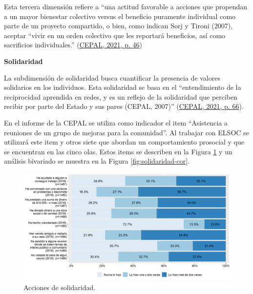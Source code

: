 \documentclass[
  12pt,
]{book}
\begin{document}
Esta tercera dimensión refiere a ``una actitud favorable a acciones que propendan a un mayor bienestar colectivo versus el beneficio puramente individual como parte de un proyecto compartido, o bien, como indican Sorj y Tironi (2007), aceptar ``vivir en un orden colectivo que les reportará beneficios, así como sacrificios individuales.'' (\protect\hyperlink{ref-cepal_cohesion_2021}{CEPAL, 2021, p. 46})

\textbf{Solidaridad}

La subdimensión de solidaridad busca cuantificar la presencia de valores solidarios en los individuos. Esta solidaridad se basa en el ``entendimiento de la reciprocidad aprendida en redes, y es un reflejo de la solidaridad que perciben recibir por parte del Estado y sus pares (CEPAL, 2007)'' (\protect\hyperlink{ref-cepal_cohesion_2021}{CEPAL, 2021, p. 66}).

En el informe de la CEPAL se utiliza como indicador el item ``Asistencia a reuniones de un grupo de mejoras para la comunidad''. Al trabajar con ELSOC se utilizará este item y otros siete que abordan un comportamiento prosocial y que se encuentran en las cinco olas. Estos items se describen en la Figura \ref{fig:solidaridad} y un análisis bivariado se muestra en la Figura \ref{fig:solidaridad-cor}.

\begin{figure}[H]

{\centering \includegraphics[width=1\linewidth,height=1\textheight]{output/graphs/solidaridad} 

}

\caption{Acciones de solidaridad.}\label{fig:solidaridad}
\end{figure}
\end{document}
